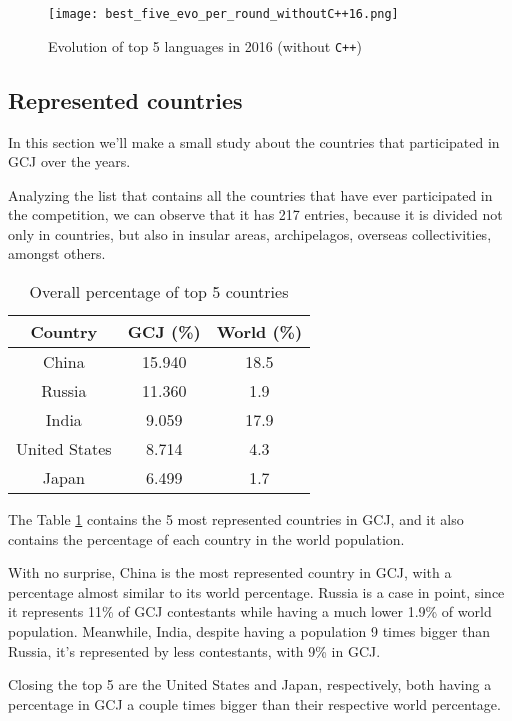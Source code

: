 \documentclass{article}
\begin{document}
\begin{multicols*}{2}
\begin{figure}[H]
    \centering
    \texttt{[image: best\_five\_evo\_per\_round\_withoutC++16.png]}
    \caption{Evolution of top 5 languages in 2016 (without \texttt{C++})}
    \label{fig:best5_evo_round_16}
\end{figure}


\subsection{Represented countries}

In this section we'll make a small study about the countries that participated in GCJ over the years.

Analyzing the list that contains all the countries that have ever participated in the competition, we can observe that it has 217 entries, because it is divided not only in countries, but also in insular areas, archipelagos, overseas collectivities, amongst others.


\begin{table}[H]
\centering
\caption{Overall percentage of top 5 countries}
\label{top10_cont}
\begin{tabular}{c|c|c}
\textbf{Country} & \textbf{GCJ (\%)} & \textbf{World (\%)} \\ \hline
China            & 15.940   & 18.5              \\
Russia           & 11.360   & 1.9               \\
India            & 9.059   & 17.9              \\
United States    & 8.714   & 4.3               \\
Japan            & 6.499   & 1.7               \\
\end{tabular}
\end{table}

The Table \ref{top10_cont} contains the 5 most represented countries in GCJ, and it also contains the percentage of each country in the world population\cite{world_perc}.

With no surprise, China is the most represented country in GCJ, with a percentage almost similar to its world percentage.
Russia is a case in point, since it represents 11\% of GCJ contestants while having a much lower 1.9\% of world population. Meanwhile, India, despite having a population 9 times bigger than Russia, it's represented by less contestants, with 9\% in GCJ.

Closing the top 5 are the United States and Japan, respectively, both having a percentage in GCJ a couple times bigger than their respective world percentage.



\end{multicols*}
\end{document}
